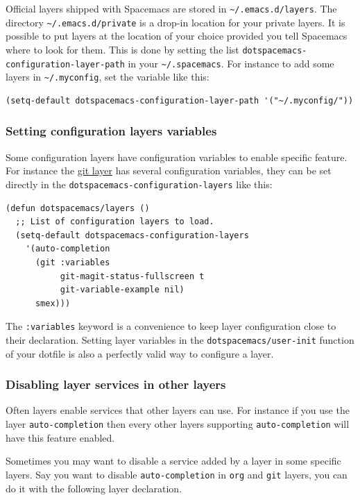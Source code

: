 \documentclass[11pt]{article}
\begin{document}
Official layers shipped with Spacemacs are stored in \texttt{\textasciitilde{}/.emacs.d/layers}. The
directory \texttt{\textasciitilde{}/.emacs.d/private} is a drop-in location for your private layers.
It is possible to put layers at the location of your choice provided you tell
Spacemacs where to look for them. This is done by setting the list
\texttt{dotspacemacs-configuration-layer-path} in your \texttt{\textasciitilde{}/.spacemacs}. For instance
to add some layers in \texttt{\textasciitilde{}/.myconfig}, set the variable like this:

\begin{verbatim}
(setq-default dotspacemacs-configuration-layer-path '("~/.myconfig/"))
\end{verbatim}

\subsubsection{Setting configuration layers variables}
\label{sec:org0bc23c8}
Some configuration layers have configuration variables to enable specific
feature. For instance the \href{../layers/+source-control/git/README.org}{git layer} has several configuration variables, they
can be set directly in the \texttt{dotspacemacs-configuration-layers} like this:

\begin{verbatim}
(defun dotspacemacs/layers ()
  ;; List of configuration layers to load.
  (setq-default dotspacemacs-configuration-layers
    '(auto-completion
      (git :variables
           git-magit-status-fullscreen t
           git-variable-example nil)
      smex)))
\end{verbatim}

The \texttt{:variables} keyword is a convenience to keep layer configuration close to
their declaration. Setting layer variables in the \texttt{dotspacemacs/user-init}
function of your dotfile is also a perfectly valid way to configure a layer.

\subsubsection{Disabling layer services in other layers}
\label{sec:org6d4425d}
Often layers enable services that other layers can use. For instance if you use
the layer \texttt{auto-completion} then every other layers supporting \texttt{auto-completion}
will have this feature enabled.

Sometimes you may want to disable a service added by a layer in some specific
layers. Say you want to disable \texttt{auto-completion} in \texttt{org} and \texttt{git} layers,
you can do it with the following layer declaration.
\end{document}
